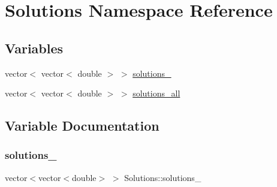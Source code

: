 \hypertarget{namespaceSolutions}{}\section{Solutions Namespace Reference}
\label{namespaceSolutions}
\subsection*{Variables}
\begin{DoxyCompactItemize}
\item 
vector$<$ vector$<$ double $>$ $>$ \mbox{\hyperlink{namespaceSolutions_a719624b0ddd892bf180206d9d4338cd2_a719624b0ddd892bf180206d9d4338cd2}{solutions\+\_}}
\item 
vector$<$ vector$<$ double $>$ $>$ \mbox{\hyperlink{namespaceSolutions_a1d52637d01c7e17fcc05a918375a7728_a1d52637d01c7e17fcc05a918375a7728}{solutions\+\_\+all}}
\end{DoxyCompactItemize}


\subsection{Variable Documentation}
\mbox{\label{namespaceSolutions_a719624b0ddd892bf180206d9d4338cd2_a719624b0ddd892bf180206d9d4338cd2}} 
\subsubsection{\texorpdfstring{solutions\+\_}{solutions\_16}}
{\footnotesize\ttfamily vector$<$vector$<$double$>$ $>$ Solutions\+::solutions\+\_}

